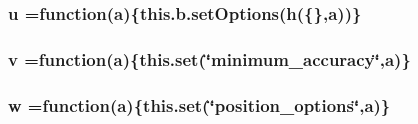 \subsubsection[{\texorpdfstring{u}{u}}]{ u =function({\bf a})\{this.\+b.\+set\+Options({\bf h}(\{\},{\bf a}))\}}\hypertarget{geolocation-marker_8js_aded72aff617710a8db854af0bbd88c2b}{}\label{geolocation-marker_8js_aded72aff617710a8db854af0bbd88c2b}
\subsubsection[{\texorpdfstring{v}{v}}]{ v =function({\bf a})\{{\bf this.\+set}(\char`\"{}minimum\+\_\+accuracy\char`\"{},a)\}}\hypertarget{geolocation-marker_8js_a835456a9fb39cad6a80ca66834ee4bce}{}\label{geolocation-marker_8js_a835456a9fb39cad6a80ca66834ee4bce}
\subsubsection[{\texorpdfstring{w}{w}}]{ w =function({\bf a})\{{\bf this.\+set}(\char`\"{}position\+\_\+options\char`\"{},a)\}}\hypertarget{geolocation-marker_8js_a9ddb7683303f389c704dae0037eb0833}{}\label{geolocation-marker_8js_a9ddb7683303f389c704dae0037eb0833}
